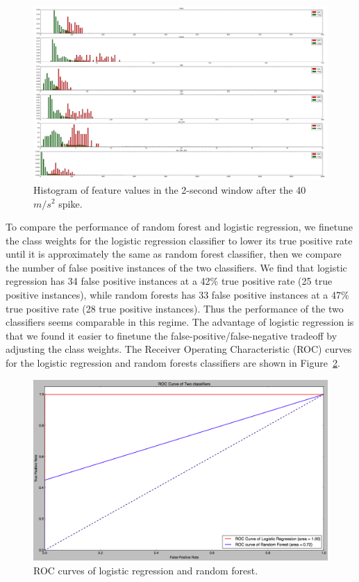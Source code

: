 \documentclass{soups}
\begin{document}
\begin{figure}[t]
\begin{center}
\includegraphics[width=\textwidth]{hist_features_after_win_size_1_2.png}
\end{center}
\caption{Histogram of feature values in the 2-second window after the 40 $m/s^2$ spike.}
\label{fig:afterhist}
\end{figure}

To compare the performance of random forest and logistic regression, we finetune the class weights for the logistic regression classifier to lower its true positive rate until it is approximately the same as random forest classifier, then we compare the number of false positive instances of the two classifiers.
We find that logistic regression has 34 false positive instances at a 42\% true positive rate (25 true positive instances),
while random forests has 33 false positive instances at a 47\% true positive rate (28 true positive instances).
Thus the performance of the two classifiers seems comparable in this regime.
The advantage of logistic regression is that we found it easier to finetune the false-positive/false-negative tradeoff by adjusting the class weights.
The Receiver Operating Characteristic (ROC) curves for the logistic regression and random forests classifiers are shown in Figure~\ref{fig:roc}.

\begin{figure}[t]
\begin{center}
\includegraphics[width=1.0\columnwidth]{roc_curves.png}
\end{center}
\caption{ROC curves of logistic regression and random forest.}
\label{fig:roc}
\end{figure}
\end{document}
